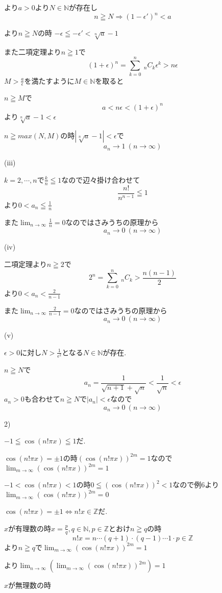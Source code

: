 \documentclass{jsarticle}
\begin{document}
より$a>0$より$N\in\mathbb{N}$が存在し
\[n\geqq N \Rightarrow (1-\epsilon')^n < a\]

より$n\geqq N$の時
$-\epsilon \leqq -\epsilon' < \sqrt[n]{a}-1$

また二項定理より$n\geqq 1$で
\[(1+\epsilon)^n = \sum_{k=0}^n \ _nC_k  \epsilon ^k > n\epsilon\]
$M > \frac{a}{\epsilon}$を満たすように$M\in \mathbb{N}$を取ると

$n\geqq M$で
\[a < n\epsilon < (1+\epsilon)^n\]
より$\sqrt[n]{a}-1 < \epsilon$

$n\geqq max(N,M)$の時$|\sqrt[n]{a}-1| < \epsilon$で
\[a_n\to1 \ (n\to \infty)\]

(iii)

$k=2,\cdots,n$で$\frac{k}{n}\leqq 1$なので辺々掛け合わせて
\[\frac{n!}{n^{n-1}}\leqq 1\]
より$0<a_n\leqq \frac{1}{n}$

また$\lim_{n\to \infty}\frac{1}{n}=0$なのではさみうちの原理から
\[a_n\to 0 \ (n\to \infty)\]

(iv)

二項定理より$n\geqq 2$で
\[2^n =\sum_{k=0}^n \ _nC_k > \frac{n(n-1)}{2}\]
より$0<a_n<\frac{2}{n-1}$

また$\lim_{n\to \infty}\frac{2}{n-1}=0$なのではさみうちの原理から
\[a_n\to 0 \ (n\to \infty)\]

(v)

$\epsilon > 0$に対し$N>\frac{1}{\epsilon ^2}$となる$N\in \mathbb{N}$が存在.

$n\geqq N$で
\[a_n=\frac{1}{\sqrt{n+1}+\sqrt{n}}<\frac{1}{\sqrt{n}}<\epsilon\]
$a_n>0$も合わせて$n\geqq N$で$|a_n|<\epsilon$なので
\[a_n\to 0 \ (n\to \infty)\]

2)

$-1\leqq \cos(n!\pi x) \leqq 1$だ.

$\cos(n!\pi x) = \pm 1$の時$(\cos(n!\pi x))^{2m} = 1$なので$\lim_{m\to \infty} (\cos(n!\pi x))^{2m} = 1$

$-1<\cos(n!\pi x) < 1$の時$0 \leqq (\cos(n!\pi x))^2 < 1$なので例6より$\lim_{m\to \infty} (\cos(n!\pi x))^{2m} = 0$

$\cos(n!\pi x) = \pm 1\Leftrightarrow n!x \in \mathbb{Z} $だ.

$x$が有理数の時$x=\frac{p}{q},q\in \mathbb{N},p\in \mathbb{Z}$とおけ$n\geqq q$の時
\[n!x = n\cdots (q+1)\cdot (q-1) \cdots  1 \cdot p \in \mathbb{Z}\]
より$n\geqq q$で$\lim_{m\to \infty} (\cos(n!\pi x))^{2m} = 1$

より$\lim_{n\to \infty}(\lim_{m\to \infty} (\cos(n!\pi x))^{2m}) = 1$

$x$が無理数の時
\end{document}
